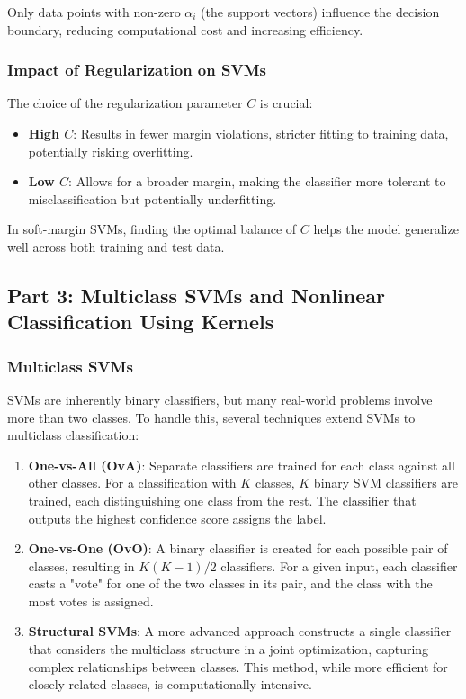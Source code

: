 \documentclass{article}
\begin{document}
Only data points with non-zero \( \alpha_i \) (the support vectors) influence the decision boundary, reducing computational cost and increasing efficiency.

\subsubsection*{Impact of Regularization on SVMs}
The choice of the regularization parameter \( C \) is crucial:
\begin{itemize}
    \item \textbf{High \( C \)}: Results in fewer margin violations, stricter fitting to training data, potentially risking overfitting.
    \item \textbf{Low \( C \)}: Allows for a broader margin, making the classifier more tolerant to misclassification but potentially underfitting.
\end{itemize}

In soft-margin SVMs, finding the optimal balance of \( C \) helps the model generalize well across both training and test data.

\subsection*{Part 3: Multiclass SVMs and Nonlinear Classification Using Kernels}

\subsubsection*{Multiclass SVMs}
SVMs are inherently binary classifiers, but many real-world problems involve more than two classes. To handle this, several techniques extend SVMs to multiclass classification:

\begin{enumerate}
    \item \textbf{One-vs-All (OvA)}: Separate classifiers are trained for each class against all other classes. For a classification with \( K \) classes, \( K \) binary SVM classifiers are trained, each distinguishing one class from the rest. The classifier that outputs the highest confidence score assigns the label.

    \item \textbf{One-vs-One (OvO)}: A binary classifier is created for each possible pair of classes, resulting in \( K(K - 1)/2 \) classifiers. For a given input, each classifier casts a "vote" for one of the two classes in its pair, and the class with the most votes is assigned.

    \item \textbf{Structural SVMs}: A more advanced approach constructs a single classifier that considers the multiclass structure in a joint optimization, capturing complex relationships between classes. This method, while more efficient for closely related classes, is computationally intensive.
\end{enumerate}
\end{document}
